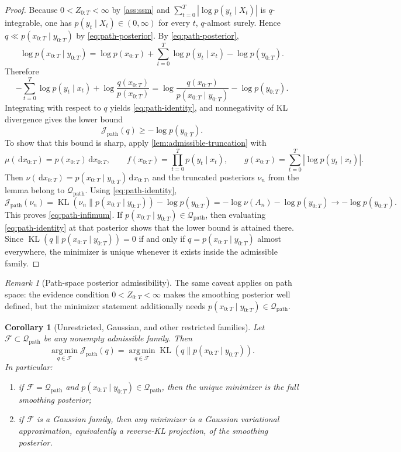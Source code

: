 \documentclass[11pt]{article}
\newcommand{\KL}{\operatorname{KL}}
\newcommand{\dd}{\,\mathrm d}
\newcommand{\argmin}{\operatorname*{arg\,min}}
\newcommand{\xtraj}{x_{0:T}}
\newcommand{\ytraj}{y_{0:T}}
\newcommand{\abs}[1]{\left\lvert #1 \right\rvert}
\newcommand{\mc}{\mathcal}
\numberwithin{equation}{section}
\theoremstyle{plain}
\newtheorem{corollary}[theorem]{Corollary}
\theoremstyle{definition}
\theoremstyle{remark}
\newtheorem{remark}[theorem]{Remark}
\begin{document}
\begin{proof}
Because $0<Z_{0:T}<\infty$ by \cref{ass:ssm} and $\sum_{t=0}^{T}\abs{\log p(y_t\mid X_t)}$ is $q$-integrable, one has $p(y_t\mid X_t)\in(0,\infty)$ for every $t$, $q$-almost surely. Hence $q\ll p(\xtraj\mid \ytraj)$ by \cref{eq:path-posterior}.
By \cref{eq:path-posterior},
\[
\log p(\xtraj\mid \ytraj)
=
\log p(\xtraj) + \sum_{t=0}^{T}\log p(y_t\mid x_t) - \log p(\ytraj).
\]
Therefore
\[
-\sum_{t=0}^{T}\log p(y_t\mid x_t) + \log\frac{q(\xtraj)}{p(\xtraj)}
=
\log\frac{q(\xtraj)}{p(\xtraj\mid \ytraj)} - \log p(\ytraj).
\]
Integrating with respect to $q$ yields \cref{eq:path-identity}, and nonnegativity of KL divergence gives the lower bound
\[
\mc J_{\mathrm{path}}(q)\ge -\log p(\ytraj).
\]
To show that this bound is sharp, apply \cref{lem:admissible-truncation} with
\[
\mu(\dd \xtraj)=p(\xtraj)\dd \xtraj,
\qquad
f(\xtraj)=\prod_{t=0}^{T}p(y_t\mid x_t),
\qquad
g(\xtraj)=\sum_{t=0}^{T}\abs{\log p(y_t\mid x_t)}.
\]
Then $\nu(\dd \xtraj)=p(\xtraj\mid \ytraj)\dd \xtraj$, and the truncated posteriors $\nu_n$ from the lemma belong to $\mc Q_{\mathrm{path}}$. Using \cref{eq:path-identity},
\[
\mc J_{\mathrm{path}}(\nu_n)
=
\KL(\nu_n\|p(\xtraj\mid \ytraj))-\log p(\ytraj)
=
-\log \nu(A_n)-\log p(\ytraj)\to -\log p(\ytraj).
\]
This proves \cref{eq:path-infimum}. If $p(\xtraj\mid \ytraj)\in\mc Q_{\mathrm{path}}$, then evaluating \cref{eq:path-identity} at that posterior shows that the lower bound is attained there. Since $\KL(q\|p(\xtraj\mid \ytraj))=0$ if and only if $q=p(\xtraj\mid \ytraj)$ almost everywhere, the minimizer is unique whenever it exists inside the admissible family.
\end{proof}

\begin{remark}[Path-space posterior admissibility]
\label{rem:path-admissibility}
The same caveat applies on path space: the evidence condition $0<Z_{0:T}<\infty$ makes the smoothing posterior well defined, but the minimizer statement additionally needs $p(\xtraj\mid \ytraj)\in\mc Q_{\mathrm{path}}$.
\end{remark}

\begin{corollary}[Unrestricted, Gaussian, and other restricted families]
\label{cor:path-restricted}
Let $\mc F\subset\mc Q_{\mathrm{path}}$ be any nonempty admissible family. Then
\begin{equation}
\argmin_{q\in\mc F}\mc J_{\mathrm{path}}(q)
=
\argmin_{q\in\mc F}\KL(q\|p(\xtraj\mid \ytraj)).
\end{equation}
In particular:
\begin{enumerate}[label=\arabic*.]
\item if $\mc F=\mc Q_{\mathrm{path}}$ and $p(\xtraj\mid \ytraj)\in\mc Q_{\mathrm{path}}$, then the unique minimizer is the full smoothing posterior;
\item if $\mc F$ is a Gaussian family, then any minimizer is a Gaussian variational approximation, equivalently a reverse-KL projection, of the smoothing posterior.
\end{enumerate}
\end{corollary}
\end{document}
